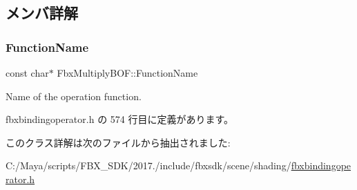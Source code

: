 \subsection{メンバ詳解}
\mbox{\label{class_fbx_multiply_b_o_f_aac9bacaab22a2dcd18c16b703892d35b}} 
\subsubsection{\texorpdfstring{Function\+Name}{FunctionName}}
{\footnotesize\ttfamily const char$\ast$ Fbx\+Multiply\+B\+O\+F\+::\+Function\+Name\hspace{0.3cm}{\ttfamily [static]}}



Name of the operation function. 



 fbxbindingoperator.\+h の 574 行目に定義があります。



このクラス詳解は次のファイルから抽出されました\+:\begin{DoxyCompactItemize}
\item 
C\+:/\+Maya/scripts/\+F\+B\+X\+\_\+\+S\+D\+K/2017./include/fbxsdk/scene/shading/\hyperlink{fbxbindingoperator_8h}{fbxbindingoperator.\+h}\end{DoxyCompactItemize}
